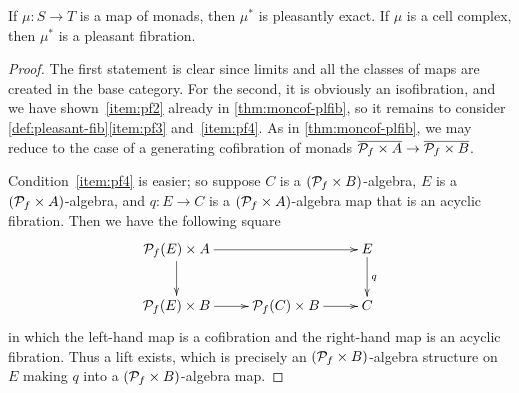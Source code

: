 \documentclass{amsart}
\begin{document}
\begin{thm}
  If $\mu:S\to T$ is a map of monads, then $\mu^*$ is pleasantly exact.
  If $\mu$ is a cell complex, then $\mu^*$ is a pleasant fibration.
\end{thm}
\begin{proof}
  The first statement is clear since limits and all the classes of maps are created in the base category.
  For the second, it is obviously an isofibration, and we have shown~\ref{item:pf2} already in \cref{thm:moncof-plfib}, so it remains to consider \cref{def:pleasant-fib}\ref{item:pf3} and~\ref{item:pf4}.
  As in \cref{thm:moncof-plfib}, we may reduce to the case of a generating cofibration of monads $\overline{ \mathcal{P}_{f} \times A} \to \overline{\mathcal{P}_{f} \times B}$.

  Condition~\ref{item:pf4} is easier; so suppose $C$ is a $(\mathcal{P}_{f} \times B)$-algebra, $E$ is a $(\mathcal{P}_{f} \times A)$-algebra, and $q:E\to C$ is a $(\mathcal{P}_{f} \times A)$-algebra map that is an acyclic fibration.
  Then we have the following square
  \begin{equation}
    \vcenter{\xymatrix{
        \poly f(E) \times A\ar[rr]\ar[d] & &
        E \ar[d]^q\\
        \poly f(E) \times B \ar[r] &
        \poly f(C) \times B \ar[r] &
        C
      }}
  \end{equation}
  in which the left-hand map is a cofibration and the right-hand map is an acyclic fibration.
  Thus a lift exists, which is precisely an $(\mathcal{P}_{f} \times B)$-algebra structure on $E$ making $q$ into a $(\mathcal{P}_{f} \times B)$-algebra map.


\end{proof}
\end{document}
